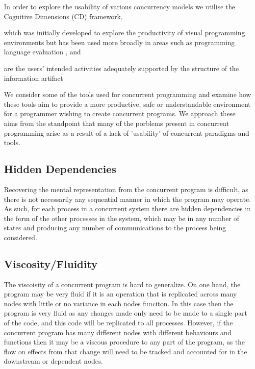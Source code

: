 \documentclass{sig-alternate}
\begin{document}
In order to explore the usability of various concurrency models we utilise the Cognitive Dimensions \cite{green89:_cognit_dimen_notat} (CD) framework, 

which was initially developed to explore the productivity of visual programming environments but has been used more broadly in areas such as programming language evaluation \cite{enpl}, and 

are the users’ intended activities adequately supported by the structure of the information artifact

We consider some of the tools used for concurrent programming and examine how these tools aim to provide a more productive, safe or understandable environment for a programmer wishing to create concurrent programs. We approach these aims from the standpoint that many of the porblems present in concurrent programming arise as a result of a lack of 'usability' of concurrent paradigms and tools.



\subsection{Hidden Dependencies}

Recovering the mental representation from the concurrent program is difficult, as there is not necessarily any sequential manner in which the program may operate. As such, for each process in a concurrent system there are hidden dependencies in the form of the other processes in the system, which may be in any number of states and producing any number of communications to the process being considered.

\subsection{Viscosity/Fluidity}
The viscoisity of a concurrent program is hard to generalize. On one hand, the program may be very fluid if it is an operation that is replicated across many nodes with little or no variance in each nodes funciton. In this case then the program is very fluid as any changes made only need to be made to a single part of the code, and this code will be replicated to all processes. However, if the concurrent program has many different nodes with different behaviours and functions then it may be a viscous procedure to any part of the program, as the flow on effects from that change will need to be tracked and accounted for in the downstream or dependent nodes.
\end{document}
